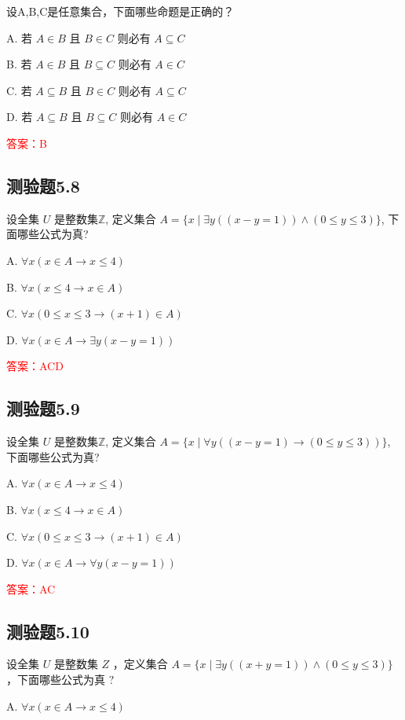 \documentclass[UTF8, heading=true]{ctexart}
\begin{document}
设A,B,C是任意集合，下面哪些命题是正确的？

A. 若 $A \in B$ 且 $B \in C$ 则必有 $A \subseteq C$

B. 若 $A \in B$ 且 $B \subseteq C$ 则必有 $A \in C$

C. 若 $A \subseteq B$ 且 $B \in C$ 则必有 $A \subseteq C$

D. 若 $A \subseteq B$ 且 $B \subseteq C$ 则必有 $A \in C$

\textcolor{red}{答案：B}



\subsection{测验题5.8}
设全集 $U$ 是整数集$\mathbb{Z}$, 定义集合 $A=\{x \mid \exists y((x-y=1)) \wedge(0 \leq y \leq 3)\}$, 下面哪些公式为真?

A. $\forall x(x \in A \rightarrow x \leq 4)$

B. $\forall x(x \leq 4 \rightarrow x \in A)$

C. $\forall x(0 \leq x \leq 3 \rightarrow(x+1) \in A)$

D. $\forall x(x \in A \rightarrow \exists y(x-y=1))$

\textcolor{red}{答案：ACD}

\subsection{测验题5.9}

设全集 $U$ 是整数集$\mathbb{Z}$, 定义集合 $A=\{x \mid \forall y((x-y=1) \rightarrow(0 \leq y \leq 3))\}$, 下面哪些公式为真?

A. $\forall x(x \in A \rightarrow x \leq 4)$

B. $\forall x(x \leq 4 \rightarrow x \in A)$

C. $\forall x(0 \leq x \leq 3 \rightarrow(x+1) \in A)$

D. $\forall x(x \in A \rightarrow \forall y(x-y=1))$

\textcolor{red}{答案：AC}

\subsection{测验题5.10}

设全集 $U$ 是整数集 $Z$ ，定义集合 $A=\{x \mid \exists y((x+y=1)) \wedge(0 \leq y \leq 3)\}$ ，下面哪些公式为真 $?$

A. $\forall x(x \in A \rightarrow x \leq 4)$
\end{document}
